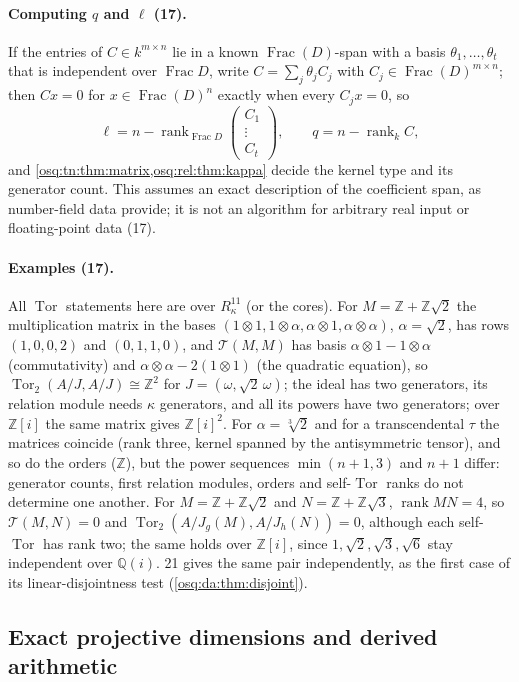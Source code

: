 \documentclass[11pt,letterpaper]{article}
\numberwithin{equation}{section}
\theoremstyle{definition}
\theoremstyle{remark}
\theoremstyle{plain}
\newcommand{\Z}{\mathbb Z}
\newcommand{\Q}{\mathbb Q}
\newcommand{\Frac}{\operatorname{Frac}}
\newcommand{\Tor}{\operatorname{Tor}}
\newcommand{\rk}{\operatorname{rank}}
\begin{document}
\paragraph{Computing $q$ and $\ell$ (17).} If the entries of $C\in k^{m\times n}$ lie in a known $\Frac(D)$-span with a basis
$\theta_1,\dots,\theta_t$ that is independent over $\Frac D$, write $C=\sum_j\theta_jC_j$ with $C_j\in\Frac(D)^{m\times n}$; then
$Cx=0$ for $x\in\Frac(D)^n$ exactly when every $C_jx=0$, so
\[
 \ell=n-\rk_{\Frac D}\begin{pmatrix}C_1\\ \vdots\\ C_t\end{pmatrix},\qquad q=n-\rk_kC ,
\]
and \cref{osq:tn:thm:matrix,osq:rel:thm:kappa} decide the kernel type and its generator count. This assumes an exact description of the
coefficient span, as number-field data provide; it is not an algorithm for arbitrary real input or floating-point data (17).

\paragraph{Examples (17).} All $\Tor$ statements here are over $R^{11}_\kappa$ (or the cores). For $M=\Z+\Z\sqrt2$ the multiplication
matrix in the bases $(1\otimes1,1\otimes\alpha,\alpha\otimes1,\alpha\otimes\alpha)$, $\alpha=\sqrt2$, has rows $(1,0,0,2)$ and $(0,1,1,0)$,
and $\mathcal T(M,M)$ has basis $\alpha\otimes1-1\otimes\alpha$ (commutativity) and $\alpha\otimes\alpha-2(1\otimes1)$ (the quadratic
equation), so $\Tor_2(A/J,A/J)\cong\Z^2$ for $J=(\omega,\sqrt2\,\omega)$; the ideal has two generators, its relation module needs $\kappa$
generators, and all its powers have two generators; over $\Z[i]$ the same matrix gives $\Z[i]^2$. For $\alpha=\sqrt[3]2$ and for a
transcendental $\tau$ the matrices coincide (rank three, kernel spanned by the antisymmetric tensor), and so do the orders ($\Z$), but
the power sequences $\min(n+1,3)$ and $n+1$ differ: generator counts, first relation modules, orders and self-$\Tor$ ranks do not
determine one another. For $M=\Z+\Z\sqrt2$ and $N=\Z+\Z\sqrt3$, $\rk MN=4$, so $\mathcal T(M,N)=0$ and $\Tor_2(A/J_g(M),A/J_h(N))=0$,
although each self-$\Tor$ has rank two; the same holds over $\Z[i]$, since $1,\sqrt2,\sqrt3,\sqrt6$ stay independent over $\Q(i)$.
21 gives the same pair independently, as the first case of its linear-disjointness test (\cref{osq:da:thm:disjoint}).

\subsection{Exact projective dimensions and derived arithmetic}\label{osq:da:sub:derived}
\end{document}
